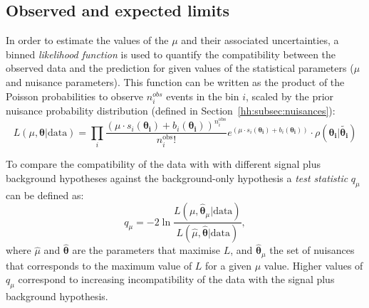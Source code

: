 \documentclass[../main.tex]{subfiles}
\begin{document}
\subsection{Observed and expected limits}

In order to estimate the values of the $\mu$ and their associated uncertainties, a binned \textit{likelihood function} is used to quantify the compatibility between the observed data and the prediction for given values of the statistical parameters ($\mu$ and nuisance parameters). This function can be written as the product of the Poisson probabilities to observe $n_i^{obs}$ events in the bin $i$, scaled by the prior nuisance probability distribution (defined in Section~\ref{hh:subsec:nuisances}):
\begin{equation}
L(\mu, \boldsymbol{\theta} | \text{data}) = \prod_i \frac{\left(\mu\cdot s_i (\boldsymbol{\theta_i}) + b_i(\boldsymbol{\theta_i}) \right)^{n_i^\text{obs}}}{n_i^\text{obs}!}e^{(\mu\cdot s_i (\boldsymbol{\theta_i}) + b_i(\boldsymbol{\theta_i}))} \cdot \rho(\boldsymbol{\theta_i}|\boldsymbol{\tilde{\theta_i}})
\end{equation}

To compare the compatibility of the data with  with different signal plus background hypotheses against the background-only hypothesis a \textit{test statistic} $q_\mu$ can be defined as:
\begin{equation}
q_\mu = -2 \ln \frac{L(\mu, \boldsymbol{\hat{\theta}}_\mu | \text{data})}{L(\hat{\mu}, \boldsymbol{\hat{\theta}} | \text{data})},
\end{equation}
where $\hat{\mu}$ and $\boldsymbol{\hat{\theta}}$ are the parameters that maximise $L$, and $\boldsymbol{\hat{\theta}}_\mu$ the set of nuisances that corresponds to the maximum value of $L$ for a given $\mu$ value. Higher values of $q_\mu$ correspond to increasing incompatibility of the data with the signal plus background hypothesis.
\end{document}

